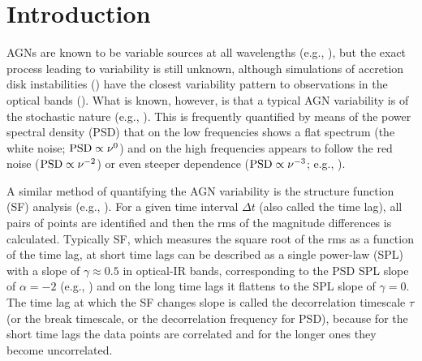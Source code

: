 \documentclass[twocolumn]{aastex6}
\begin{document}
\section{Introduction}

AGNs are known to be variable sources at all wavelengths 
(e.g., \citealt{1993ARA&A..31..717M, %
2004ApJ...601..692V, %
2005ApJ...618..108B, %
2005MNRAS.359.1469M, %
2010ApJ...721.1014M, %
2011ApJ...743..171A, %
2016ApJ...817..119K, %
2016A&A...593A..55V}), %
but the exact process leading to variability is still unknown, although simulations of accretion disk instabilities (\citealt{1998ApJ...504..671K}) have the closest variability 
pattern to observations in the optical bands (\citealt{1995ApJ...441..354C,2004ApJ...601..692V,2016ApJ...826..118K}). What is known, however, is that a typical AGN variability is of the stochastic 
nature (e.g., \citealt{2009ApJ...698..895K,2013ApJ...765..106Z,2013A&A...554A.137A,2016ApJ...826..118K}).
This is frequently quantified by means of the power spectral density (PSD) that
on the low frequencies shows a flat spectrum (the white noise; $\rm PSD\propto\nu^{0}$) 
and on the high frequencies appears to follow the red noise ($\rm PSD\propto\nu^{-2}$)
or even steeper dependence ($\rm PSD\propto\nu^{-3}$; e.g., \citealt{2011ApJ...743L..12M,2015MNRAS.451.4328K,2016A&A...585A.129S}). 

A similar method of quantifying the AGN variability is the structure function (SF) analysis (e.g., \citealt{1984ApJ...284..126S,1985ApJ...296...46S,1992ApJ...396..469H,1996ApJ...463..466D,2001ApJ...555..775C,2010MNRAS.404..931E,2012ApJ...753..106M,2016ApJ...826..118K}).
For a given time interval $\Delta t$ (also called the time lag), all pairs of points are identified and then the rms 
of the magnitude differences is calculated.
Typically SF, which measures the square root of the rms as a function of the time lag,  
at short time lags can be described as a single power-law (SPL) with a slope
of $\gamma\approx 0.5$ in optical-IR bands, corresponding to the PSD SPL slope of $\alpha=-2$ (e.g., \citealt{2001ApJ...555..775C,2012ApJ...753..106M,2016ApJ...817..119K,2016ApJ...826..118K}) and on the long time lags it flattens to the SPL slope of $\gamma=0$. 
The time lag at which the SF changes slope is called the decorrelation timescale $\tau$ (or the break timescale, or the decorrelation frequency for PSD), 
because for the short time lags the data points are correlated and 
for the longer ones they become uncorrelated.
\end{document}
